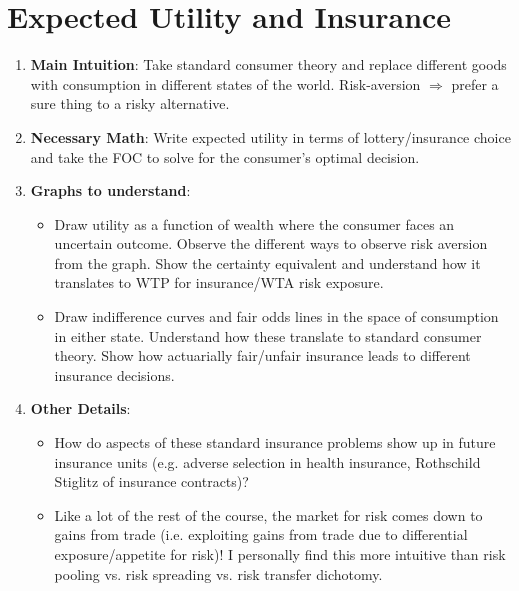 \documentclass[letter,12pt]{article}
\author{}
\title{}
\date{}
\begin{document}
\section{Expected Utility and Insurance}

\begin{enumerate}
	\item \textbf{Main Intuition}: Take standard consumer theory and replace different goods with consumption in different states of the world. Risk-aversion $\Rightarrow$ prefer a sure thing to a risky alternative.
	\item \textbf{Necessary Math}: Write expected utility in terms of lottery/insurance choice and take the FOC to solve for the consumer's optimal decision.
	\item \textbf{Graphs to understand}: 
	\begin{itemize}
		\item Draw utility as a function of wealth where the consumer faces an uncertain outcome. Observe the different ways to observe risk aversion from the graph. Show the certainty equivalent and understand how it translates to WTP for insurance/WTA risk exposure.
		\item Draw indifference curves and fair odds lines in the space of consumption in either state. Understand how these translate to standard consumer theory. Show how actuarially fair/unfair insurance leads to different insurance decisions. 
	\end{itemize}
	\item \textbf{Other Details}:
	\begin{itemize}
		\item How do aspects of these standard insurance problems show up in future insurance units (e.g. adverse selection in health insurance, Rothschild Stiglitz of insurance contracts)?
		\item Like a lot of the rest of the course, the market for risk comes down to gains from trade (i.e. exploiting gains from trade due to differential exposure/appetite for risk)! I personally find this more intuitive than risk pooling vs. risk spreading vs. risk transfer dichotomy.
	\end{itemize} 
\end{enumerate}
\end{document}
